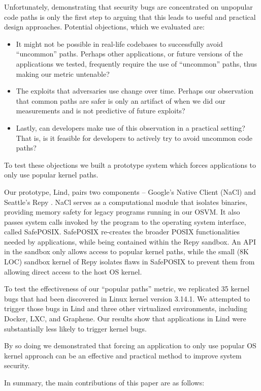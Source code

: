 Unfortunately, demonstrating that security bugs are concentrated on unpopular
code paths is only the first step to arguing that this leads to useful and
practical design approaches.  Potential objections, which we evaluated are:
\begin{itemize}
\item It might not be possible in real-life codebases to successfully avoid ``uncommon'' paths.  Perhaps other applications, or future versions of the applications we tested, frequently require the use of ``uncommon'' paths, thus making our metric untenable?
\item The exploits that adversaries use change over time.  Perhaps our observation that common paths are safer  is only an artifact of when we did our measurements and is not predictive of future exploits?
\item Lastly, can developers make use of this observation in a practical setting?  That is, is it feasible for developers to actively try to avoid uncommon code paths?
\end{itemize}
To test these objections we built a prototype system which forces applications
to only use popular kernel paths.


Our prototype, Lind, pairs two components -- Google's Native Client
(NaCl) \cite{NaCl-09} and Seattle's Repy \cite{Repy-10}.
NaCl serves as a computational module that isolates
binaries, providing memory safety for legacy programs running in our OSVM.
It also passes system calls invoked by the program to the operating system interface, called SafePOSIX.
SafePOSIX re-creates the broader POSIX functionalities needed by applications, while being contained within the Repy sandbox. 
An API in the sandbox only allows access to popular kernel paths, while
the small (8K LOC) sandbox kernel of Repy isolates flaws in SafePOSIX
to prevent them from allowing direct access to the host OS kernel.

To test the effectiveness of our ``popular paths'' metric, 
we replicated 35 kernel bugs that had been
discovered in Linux kernel version 3.14.1.  We attempted to trigger those
bugs in Lind and three other virtualized environments,
including Docker, LXC, and Graphene.
Our results show that applications in Lind were substantially less likely to trigger
kernel bugs.

By so doing we demonstrated that forcing an application to only use popular
OS kernel approach can be an effective and practical method to improve
system security.

In summary, the main contributions of this paper are as follows:

